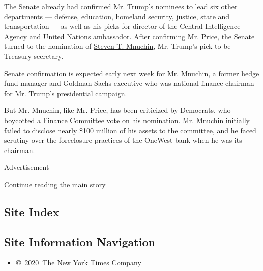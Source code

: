 The Senate already had confirmed Mr. Trump's nominees to lead six other
departments ---
\href{https://www.nytimes.com/2017/01/20/us/politics/trump-cabinet-confirmation-mattis-kelly.html}{defense},
\href{https://www.nytimes.com/2017/02/07/us/politics/betsy-devos-education-secretary-confirmed.html}{education},
homeland security,
\href{https://www.nytimes.com/2017/02/08/us/politics/jeff-sessions-attorney-general-confirmation.html}{justice},
\href{https://www.nytimes.com/2017/02/01/us/politics/rex-tillerson-secretary-of-state-confirmed.html}{state}
and transportation --- as well as his picks for director of the Central
Intelligence Agency and United Nations ambassador. After confirming Mr.
Price, the Senate turned to the nomination of
\href{https://www.nytimes.com/2016/12/19/business/dealbook/steven-mnuchin-trump-treasury-hedge-funds.html}{Steven
T. Mnuchin}, Mr. Trump's pick to be Treasury secretary.

Senate confirmation is expected early next week for Mr. Mnuchin, a
former hedge fund manager and Goldman Sachs executive who was national
finance chairman for Mr. Trump's presidential campaign.

But Mr. Mnuchin, like Mr. Price, has been criticized by Democrats, who
boycotted a Finance Committee vote on his nomination. Mr. Mnuchin
initially failed to disclose nearly \$100 million of his assets to the
committee, and he faced scrutiny over the foreclosure practices of the
OneWest bank when he was its chairman.

Advertisement

\protect\hyperlink{after-bottom}{Continue reading the main story}

\hypertarget{site-index}{%
\subsection{Site Index}\label{site-index}}

\hypertarget{site-information-navigation}{%
\subsection{Site Information
Navigation}\label{site-information-navigation}}

\begin{itemize}
\tightlist
\item
  \href{https://help.nytimes.com/hc/en-us/articles/115014792127-Copyright-notice}{©~2020~The
  New York Times Company}
\end{itemize}


